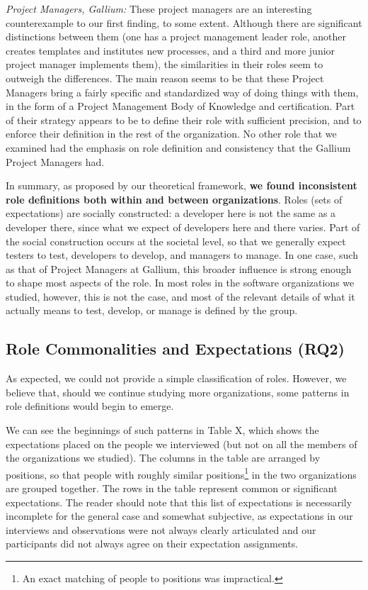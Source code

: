 \documentclass[10pt, conference, compsocconf]{IEEEtran}
\begin{document}
\emph{Project Managers, Gallium:} These project managers are an interesting counterexample to our first finding, to some extent. Although there are significant distinctions between them (one has a project management leader role, another creates templates and institutes new processes, and a third and more junior project manager implements them), the similarities in their roles seem to outweigh the differences. The main reason seems to be that these Project Managers bring a fairly specific and standardized way of doing things with them, in the form of a Project Management Body of Knowledge and certification. Part of their strategy appears to be to define their role with sufficient precision, and to enforce their definition in the rest of the organization. No other role that we examined had the emphasis on role definition and consistency that the Gallium Project Managers had.

In summary, as proposed by our theoretical framework, \textbf{we found inconsistent role definitions both within and between organizations}. Roles (sets of expectations) are socially constructed: a developer here is not the same as a developer there, since what we expect of developers here and there varies. Part of the social construction occurs at the societal level, so that we generally expect testers to test, developers to develop, and managers to manage. In one case, such as that of Project Managers at Gallium, this broader influence is strong enough to shape most aspects of the role. In most roles in the software organizations we studied, however, this is not the case, and most of the relevant details of what it actually means to test, develop, or manage is defined by the group.


\subsection{Role Commonalities and Expectations (RQ2)}

As expected, we could not provide a simple classification of roles. However, we believe that, should we continue studying more organizations, some patterns in role definitions would begin to emerge.

We can see the beginnings of such patterns in Table X, which shows the expectations placed on the people we interviewed (but not on all the members of the organizations we studied). The columns in the table are arranged by positions, so that people with roughly similar positions\footnote{An exact matching of people to positions was impractical.} in the two organizations are grouped together. The rows in the table represent common or significant expectations. The reader should note that this list of expectations is necessarily incomplete for the general case and somewhat subjective, as expectations in our interviews and observations were not always clearly articulated and our participants did not always agree on their expectation assignments.
\end{document}
